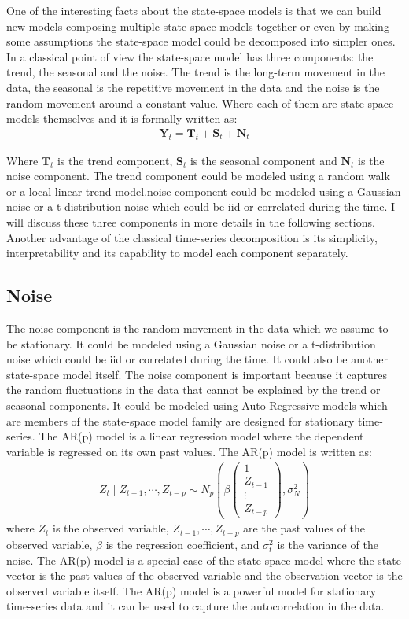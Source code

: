 \documentclass{IEEEtran}
\begin{document}
    One of the interesting facts about the state-space models is that we can build new models composing multiple state-space models together or even by making some assumptions the state-space model could be decomposed into simpler ones. In a classical point of view the state-space model has three components: the trend, the seasonal and the noise. The trend is the long-term movement in the data, the seasonal is the repetitive movement in the data and the noise is the random movement around a constant value. Where each of them are state-space models themselves and it is formally written as:
    \begin{gather}
      \mathbf{Y}_t = \mathbf{T}_t + \mathbf{S}_t + \mathbf{N}_t
    \end{gather}

    Where $\mathbf{T}_t$ is the trend component, $\mathbf{S}_t$ is the seasonal component and $\mathbf{N}_t$ is the noise component. The trend component could be modeled using a random walk or a local linear trend model.noise component could be modeled using a Gaussian noise or a t-distribution noise which could be iid or correlated during the time. I will discuss these three components in more details in the following sections. Another advantage of the classical time-series decomposition is its simplicity, interpretability and its capability to model each component separately.

    \subsection{Noise}
    The noise component is the random movement in the data which we assume to be stationary. It could be modeled using a Gaussian noise or a t-distribution noise which could be iid or correlated during the time. It could also be another state-space model itself. The noise component is important because it captures the random fluctuations in the data that cannot be explained by the trend or seasonal components. It could be modeled using Auto Regressive models which are members of the state-space model family are designed for stationary time-series. The AR(p) model is a linear regression model where the dependent variable is regressed on its own past values. The AR(p) model is written as:
  \begin{gather}
    \label{eq:ar}
    Z_t \mid Z_{t-1}, \cdots, Z_{t-p} \sim N_p(\beta \begin{pmatrix}
      1\\
      Z_{t-1}\\
      \vdots\\
      Z_{t-p}
    \end{pmatrix}, \sigma_N^2)
  \end{gather}
  where $Z_t$ is the observed variable, $Z_{t-1}, \cdots, Z_{t-p}$ are the past values of the observed variable, $\beta$ is the regression coefficient, and $\sigma^2_t$ is the variance of the noise. The AR(p) model is a special case of the state-space model where the state vector is the past values of the observed variable and the observation vector is the observed variable itself. The AR(p) model is a powerful model for stationary time-series data and it can be used to capture the autocorrelation in the data.
\end{document}
